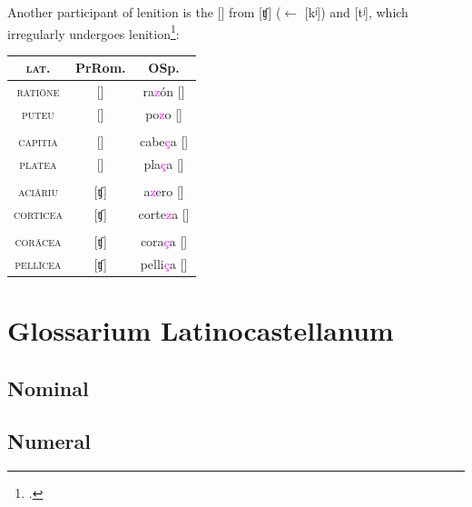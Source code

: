 \documentclass{report}[12pt]
\begin{document}
Another participant of lenition is the [\textipa{\texttslig}] from [ʧ] ($\leftarrow$ [kʲ]) and [tʲ], which irregularly undergoes lenition\footcite[p.~261]{lloyd_spanish}:
\begin{center}
  \begin{tabular}{c c c}
    \textsc{lat.} & PrRom. & OSp. \\
    \hline
    \textsc{rati\={o}ne} & [\textipa{\texttslig}] & ra\textcolor{magenta}{z}ón [\textipa{\textdzlig}] \\
    \textsc{puteu} & [\textipa{\texttslig}] & po\textcolor{magenta}{z}o [\textipa{\textdzlig}] \\
                  & \\
    \textsc{capitia} & [\textipa{\texttslig}] & cabe\textcolor{magenta}{\c{c}}a [\textipa{\texttslig}] \\
    \textsc{platea} & [\textipa{\texttslig}] & pla\textcolor{magenta}{\c{c}}a [\textipa{\texttslig}] \\
                  & \\
    \textsc{aci\={a}riu} & [ʧ] & a\textcolor{magenta}{z}ero [\textipa{\textdzlig}] \\
    \textsc{corticea} & [ʧ] & corte\textcolor{magenta}{z}a [\textipa{\textdzlig}] \\
                  & \\
    \textsc{cor\={a}cea} & [ʧ] & cora\textcolor{magenta}{\c{c}}a [\textipa{\texttslig}] \\
    \textsc{pell\={i}cea} & [ʧ] & pelli\textcolor{magenta}{\c{c}}a [\textipa{\texttslig}] \\
  \end{tabular}
\end{center}

\chapter{Glossarium Latinocastellanum}

\section{Nominal}

\section{Numeral}

\end{document}

